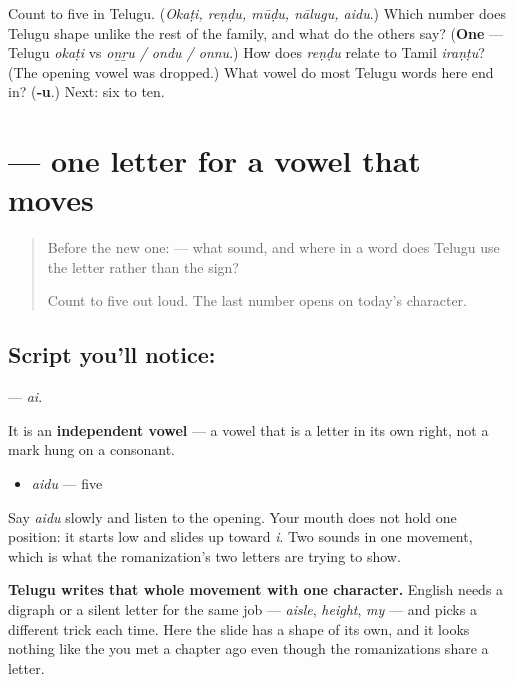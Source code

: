 \begin{tcolorbox}[breakable,colback=teal!4,colframe=teal!35!black,title={Before you move on}]
Count to five in Telugu. (\emph{Okaṭi, reṇḍu, mūḍu, nālugu, aidu}.) Which number does Telugu shape unlike the rest of the family, and what do the others say? (\textbf{One} — Telugu \emph{okaṭi} vs \emph{oṉṟu / ondu / onnu}.) How does \emph{reṇḍu} relate to Tamil \emph{iraṇṭu}? (The opening vowel was dropped.) What vowel do most Telugu words here end in? (\textbf{‑u}.) Next: six to ten.
\end{tcolorbox}
\section[\texorpdfstring{\te{ఐ} (ai)}{ఐ (ai)}]{ — one letter for a vowel that moves}

\label{lesson:TE-S164-letter-ai}



\begin{quote}
Before the new one:  — what sound, and where in a word does Telugu use the letter rather than the sign?

Count to five out loud. The last number opens on today's character.
\end{quote}

\subsection*{Script you'll notice: }
\textbf{} — \emph{ai}.

It is an \textbf{independent vowel} — a vowel that is a letter in its own right, not a mark hung on a consonant.

\begin{itemize}
\raggedright
  \item \textbf{} \emph{aidu} — five
\end{itemize}

Say \emph{aidu} slowly and listen to the opening. Your mouth does not hold one position: it starts low and slides up toward \emph{i}. Two sounds in one movement, which is what the romanization's two letters are trying to show.

\textbf{Telugu writes that whole movement with one character.} English needs a digraph or a silent letter for the same job — \emph{aisle}, \emph{height}, \emph{my} — and picks a different trick each time. Here the slide has a shape of its own, and it looks nothing like the  you met a chapter ago even though the romanizations share a letter.

